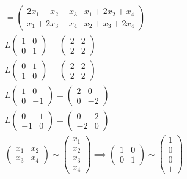 \documentclass[a4paper,12pt]{article}
\begin{document}
\begin{definition}
\begin{question}
\begin{subquestion}
\begin{answer}
\begin{gather*}
  = \begin{pmatrix} 2x_1+x_2+x_3 & x_1+2x_2+x_4\\ x_1+2x_3+x_4 & x_2+x_3+2x_4 \end{pmatrix}\\
  L\begin{pmatrix} 1 & 0\\ 0 & 1 \end{pmatrix} = \begin{pmatrix} 2 & 2\\ 2 & 2 \end{pmatrix}\\
  L\begin{pmatrix} 0 & 1\\ 1 & 0 \end{pmatrix} = \begin{pmatrix} 2 & 2\\ 2 & 2 \end{pmatrix}\\
  L\begin{pmatrix} 1 & 0\\ 0 & -1 \end{pmatrix} = \begin{pmatrix} 2 & 0\\ 0 & -2 \end{pmatrix}\\
  L\begin{pmatrix} 0 & 1\\ -1 & 0 \end{pmatrix} = \begin{pmatrix} 0 & 2\\ -2 & 0 \end{pmatrix}\\
  \begin{pmatrix} x_1 & x_2\\ x_3 & x_4 \end{pmatrix} \sim \begin{pmatrix} x_1\\ x_2\\ x_3\\ x_4 \end{pmatrix} \implies \begin{pmatrix} 1 & 0\\ 0 & 1 \end{pmatrix} \sim \begin{pmatrix} 1\\ 0\\ 0\\ 1 \end{pmatrix}\\

\end{gather*}
\end{answer}
\end{subquestion}
\end{question}
\end{definition}
\end{document}
